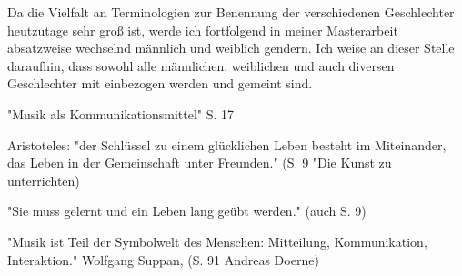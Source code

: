Da die Vielfalt an Terminologien zur Benennung der verschiedenen
Geschlechter heutzutage sehr groß ist, werde ich fortfolgend in meiner Masterarbeit
absatzweise wechselnd männlich und weiblich gendern. Ich weise an dieser Stelle
daraufhin, dass sowohl alle männlichen, weiblichen und auch diversen
Geschlechter mit einbezogen werden und gemeint sind. 




"Musik als Kommunikationsmittel" S. 17

Aristoteles: "der Schlüssel zu einem glücklichen Leben besteht im Miteinander,
das Leben in der Gemeinschaft unter Freunden." (S. 9 "Die Kunst zu unterrichten)

"Sie muss gelernt und ein Leben lang geübt werden." (auch S. 9)


"Musik ist Teil der Symbolwelt des Menschen: Mitteilung, Kommunikation,
Interaktion." Wolfgang Suppan, (S. 91 Andreas Doerne)

